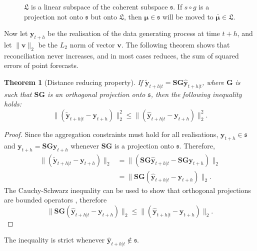 \documentclass[12pt]{article}
\newtheorem{theo}{Theorem}[section]
\theoremstyle{definition}
\begin{document}
	
	\begin{figure}[!b]
		\centering
		\vspace{-0.9cm}
		\small
		\resizebox{\linewidth}{!}{
			
		}
		\caption{$\mathfrak{L}$ is a linear subspace of the coherent subspace $\mathfrak{s}$. If $s\circ g$ is a projection not onto $\mathfrak{s}$ but onto $\mathfrak{L}$, then $\bm{\mu} \in \mathfrak{s}$ will be moved to $\bar{\bm{\mu}} \in \mathfrak{L}$.}\label{fig:Schematic_3D}
	\end{figure}
	
	
	
	
		
	Now let $\bm{y}_{t+h}$ be the realisation of the data generating process at time $t+h$, and let $\|\bm{v}\|_2$ be the $L_2$ norm of vector $\bm{v}$. The following theorem shows that reconciliation never increases, and in most cases reduces, the sum of squared errors of point forecasts.
	
	
	
	\begin{theo}[Distance reducing property]
		If $\tilde{\bm{y}}_{t+h|t}=\bm{S}\bm{G}\hat{\bm{y}}_{t+h|t}$, where $\bm{G}$ is such that $\bm{S}\bm{G}$ is an orthogonal projection onto $\mathfrak{s}$, then the following inequality holds:
		\begin{equation}
		\|(\tilde{\bm{y}}_{t+h|t}-\bm{y}_{t+h})\|^2_2\le\|(\hat{\bm{y}}_{t+h|t}-\bm{y}_{t+h})\|^2_2.
		\end{equation}
	\end{theo}
	\begin{proof}
		Since the aggregation constraints must hold for all realisations, $\bm{y}_{t+h}\in\mathfrak{s}$ and $\bm{y}_{t+h}=\bm{S}\bm{G}\bm{y}_{t+h}$ whenever $\bm{S}\bm{G}$ is a projection onto $\mathfrak{s}$. Therefore,
		\begin{align}
		\|(\tilde{\bm{y}}_{t+h|t}-\bm{y}_{t+h})\|_2&=\|(\bm{S}\bm{G}\hat{\bm{y}}_{t+h|t}-\bm{S}\bm{G}\bm{y}_{t+h})\|_2\\
		&=\|\bm{S}\bm{G}(\hat{\bm{y}}_{t+h|t}-\bm{y}_{t+h})\|_2.
		\end{align}
		The Cauchy-Schwarz inequality can be used to show that orthogonal projections are bounded operators \citep{Hun2001}, therefore
		\begin{equation*}
		\|\bm{S}\bm{G}(\hat{\bm{y}}_{t+h|t}-\bm{y}_{t+h})\|_2\le
		\|(\hat{\bm{y}}_{t+h|t}-\bm{y}_{t+h})\|_2.
		\end{equation*}
	\end{proof}
	The inequality is strict whenever $\hat{\bm{y}}_{t+h|t}\notin\mathfrak{s}$.
	
\end{document}
